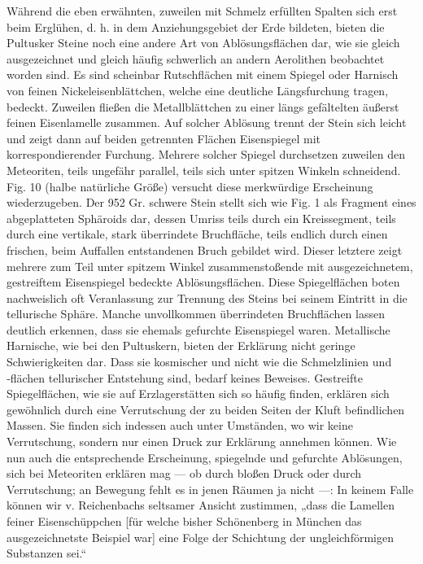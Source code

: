\documentclass[a4paper, 11pt, oneside, german]{article}
\begin{document}
Während die eben erwähnten, zuweilen mit Schmelz erfüllten Spalten sich erst beim Erglühen, d. h. in dem Anziehungsgebiet der Erde bildeten, bieten die Pultusker Steine noch eine andere Art von Ablösungsflächen dar, wie sie gleich ausgezeichnet und gleich häufig schwerlich an andern Aerolithen beobachtet worden sind. Es sind scheinbar Rutschflächen mit einem Spiegel oder Harnisch von feinen Nickeleisenblättchen, welche eine deutliche Längsfurchung tragen, bedeckt. Zuweilen fließen die Metallblättchen zu einer längs gefältelten äußerst feinen Eisenlamelle zusammen. Auf solcher Ablösung trennt der Stein sich leicht und zeigt dann auf beiden getrennten Flächen Eisenspiegel mit korrespondierender Furchung. Mehrere solcher Spiegel durchsetzen zuweilen den Meteoriten, teils ungefähr parallel, teils sich unter spitzen Winkeln schneidend. Fig. 10 (halbe natürliche Größe) versucht diese merkwürdige Erscheinung wiederzugeben. Der 952 Gr. schwere Stein stellt sich wie Fig. 1 als Fragment eines abgeplatteten Sphäroids dar, dessen Umriss teils durch ein Kreissegment, teils durch eine vertikale, stark überrindete Bruchfläche, teils endlich durch einen frischen, beim Auffallen entstandenen Bruch gebildet wird. Dieser letztere zeigt mehrere zum Teil unter spitzem Winkel zusammenstoßende mit ausgezeichnetem, gestreiftem Eisenspiegel bedeckte Ablösungsflächen. Diese Spiegelflächen boten nachweislich oft Veranlassung zur Trennung des Steins bei seinem Eintritt in die tellurische Sphäre. Manche unvollkommen überrindeten Bruchflächen lassen deutlich erkennen, dass sie ehemals gefurchte Eisenspiegel waren. Metallische Harnische, wie bei den Pultuskern, bieten der Erklärung nicht geringe Schwierigkeiten dar. Dass sie kosmischer und nicht wie die Schmelzlinien und ‑flächen tellurischer Entstehung sind, bedarf keines Beweises. Gestreifte Spiegelflächen, wie sie auf Erzlagerstätten sich so häufig finden, erklären sich gewöhnlich durch eine Verrutschung der zu beiden Seiten der Kluft befindlichen Massen. Sie finden sich indessen auch unter Umständen, wo wir keine Verrutschung, sondern nur einen Druck zur Erklärung annehmen können. Wie nun auch die entsprechende Erscheinung, spiegelnde und gefurchte Ablösungen, sich bei Meteoriten erklären mag --- ob durch bloßen Druck oder durch Verrutschung; an Bewegung fehlt es in jenen Räumen ja nicht ---: In keinem Falle können wir v. Reichenbachs seltsamer Ansicht zustimmen, „dass die Lamellen feiner Eisenschüppchen [für welche bisher Schönenberg in München das ausgezeichnetste Beispiel war] eine Folge der Schichtung der ungleichförmigen Substanzen sei.“
\end{document}
